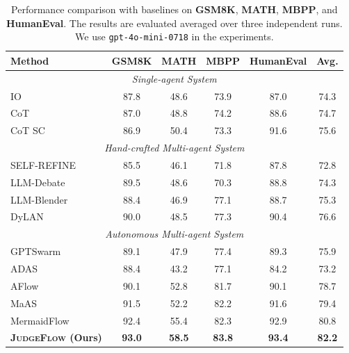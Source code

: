 \documentclass{article}
\theoremstyle{plain}
\theoremstyle{definition}
\theoremstyle{remark}
\def \our{\textsc{JudgeFlow}}
\begin{document}
\begin{table}[h]
  \centering
  \captionsetup{width=0.8\textwidth}
  \caption{Performance comparison with baselines on \textbf{GSM8K}, \textbf{MATH}, \textbf{MBPP}, and \textbf{HumanEval}. The results are evaluated averaged over three independent runs. We use \texttt{gpt-4o-mini-0718} in the experiments.}
  \label{tab:full_width}
    \begin{tabular}{l|cccc|c}
    \toprule
    
    
    \textbf{Method} & \textbf{GSM8K}  & \textbf{MATH} & \textbf{MBPP} & \textbf{HumanEval} & \textbf{Avg.} \\
    \midrule
    \multicolumn{6}{c}{\textit{Single-agent System}} \\
    \midrule
    IO & 87.8  & 48.6 & 73.9 & 87.0 & 74.3 \\
    CoT~\citep{wei2023chainofthoughtpromptingelicitsreasoning} & 87.0  & 48.8 & 74.2  & 88.6 & 74.7 \\
    CoT SC~\citep{wang2023selfconsistencyimproveschainthought} & 86.9  & 50.4 & 73.3  & 91.6 & 75.6 \\
    \midrule
    \multicolumn{6}{c}{\textit{Hand-crafted Multi-agent System}} \\
    \midrule
    SELF-REFINE~\citep{madaan_self-refine_nodate} & 85.5  & 46.1 & 71.8  & 87.8 & 72.8 \\
    LLM-Debate~\citep{du_improving_2023} & 89.5 & 48.6 & 70.3 & 88.8 & 74.3 \\
    LLM-Blender~\citep{jiang2023llmblenderensemblinglargelanguage} & 88.4 & 46.9 & 77.1 & 88.7 & 75.3 \\
    DyLAN~\citep{liu_dynamic_2024} & 90.0 & 48.5 & 77.3 & 90.4 & 76.6 \\
    \midrule
    \multicolumn{6}{c}{\textit{Autonomous Multi-agent System}} \\
    \midrule
    GPTSwarm~\citep{zhuge_language_2024} & 89.1 & 47.9 & 77.4 & 89.3 & 75.9 \\
    ADAS~\citep{hu_automated_2025} & 88.4 & 43.2 & 77.1 & 84.2 & 73.2 \\
    AFlow~\citep{zhang_aflow_2025} & 90.1 & 52.8 & 81.7 & 90.1 & 78.7 \\
    MaAS~\citep{zhang_multi-agent_2025} & 91.5 & 52.2 & 82.2 & 91.6 & 79.4 \\
    MermaidFlow~\citep{zheng_mermaidflow_2025} & 92.4 & 55.4 & 82.3 & 92.9 & 80.8\\
    \midrule
    \textbf{\our{} (Ours)} & \textbf{93.0} & \textbf{58.5} & \textbf{83.8} & \textbf{93.4} &  \textbf{82.2}\\
    \bottomrule
\end{tabular}
\end{table}
\end{document}
